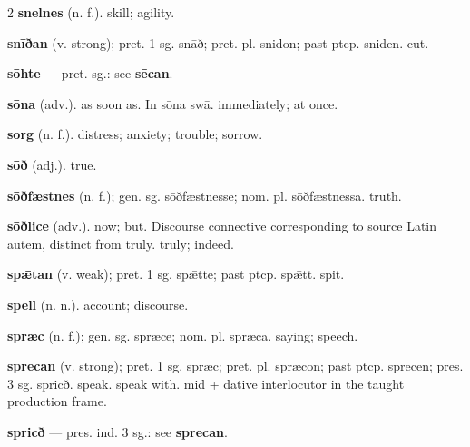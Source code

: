 \begin{multicols*}{2}
\textbf{snelnes} (n. f.). skill; agility.\par
\textbf{snīðan} (v. strong); pret. 1 sg. snāð; pret. pl. snidon; past ptcp. sniden. cut.\par
\textbf{sōhte} — pret. sg.: see \textbf{sēcan}.\par
\textbf{sōna} (adv.). as soon as. In sōna swā. immediately; at once.\par
\textbf{sorg} (n. f.). distress; anxiety; trouble; sorrow.\par
\textbf{sōð} (adj.). true.\par
\textbf{sōðfæstnes} (n. f.); gen. sg. sōðfæstnesse; nom. pl. sōðfæstnessa. truth.\par
\textbf{sōðlice} (adv.). now; but. Discourse connective corresponding to source Latin autem, distinct from truly. truly; indeed.\par
\textbf{spǣtan} (v. weak); pret. 1 sg. spǣtte; past ptcp. spǣtt. spit.\par
\textbf{spell} (n. n.). account; discourse.\par
\textbf{sprǣc} (n. f.); gen. sg. sprǣce; nom. pl. sprǣca. saying; speech.\par
\textbf{sprecan} (v. strong); pret. 1 sg. spræc; pret. pl. sprǣcon; past ptcp. sprecen; pres. 3 sg. spricð. speak. speak with. mid + dative interlocutor in the taught production frame.\par
\textbf{spricð} — pres. ind. 3 sg.: see \textbf{sprecan}.\par

\end{multicols*}
